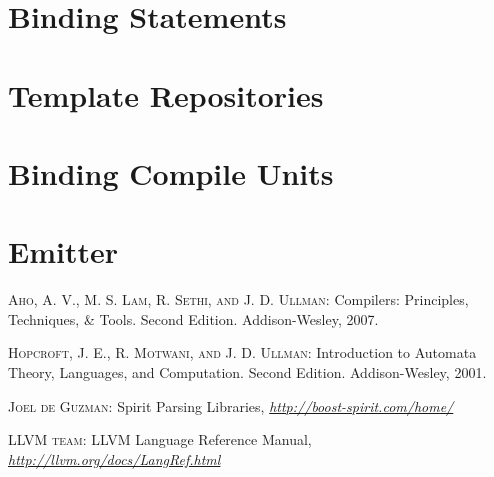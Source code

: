 \documentclass[a4paper,oneside,11pt]{book}
\theoremstyle{definition}
\begin{document}
\chapter{Binding Statements}

\chapter{Template Repositories}

\chapter{Binding Compile Units}

\chapter{Emitter}

\clearpage
\begin{thebibliography}{4}

 \textsc{Aho, A. V., M. S. Lam, R. Sethi, and J. D. Ullman}:
Compilers: Principles, Techniques, \& Tools. Second Edition. Addison-Wesley, 2007.

 \textsc{Hopcroft, J. E., R. Motwani, and J. D. Ullman}:
Introduction to Automata Theory, Languages, and Computation. Second Edition. Addison-Wesley, 2001.

 \textsc{Joel de Guzman}:
Spirit Parsing Libraries,
\textit{\url{http://boost-spirit.com/home/}}

 \textsc{LLVM team}:
LLVM Language Reference Manual,
\textit{\url{http://llvm.org/docs/LangRef.html}}

\end{thebibliography}
\end{document}
